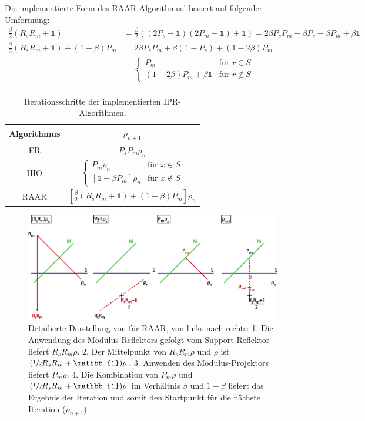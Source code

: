 	Die implementierte Form des RAAR Algorithmus' basiert auf folgender Umformung:
	\begin{align*}
	\frac{\beta}{2}\left(R_sR_m+\mathbb{1}\right)
	&=\frac{\beta}{2}\left((2P_s-\mathbb{1})(2P_m-\mathbb{1})+\mathbb{1}\right)
		=2\beta P_sP_m-\beta P_s-\beta P_m+\beta\mathbb{1}\\
		\frac{\beta}{2}\left(R_sR_m+\mathbb{1}\right)+\left(1-\beta\right) P_m
		&=2\beta P_sP_m+\beta (\mathbb{1}-P_s)+ (1-2\beta)P_m\\
		&=
		\begin{cases}
			P_m &\text{für } r\in S\\
			(1-2\beta)P_m+\beta\mathbb{1}  &\text{für } r\notin S
		\end{cases}\\
	\end{align*}
\begin{table}
	\centering
	\begin{tabular}{cc}
		\hline\hline
		Algorithmus 	&$\rho_{n+1}$\\ 							
		\hline
		ER  			&$P_sP_m\rho_n$\\ 								
		HIO  			&$\begin{cases}	
		P_m\rho_n  &\text{für } x\in S\\
		\left[\mathbb{1}-\beta P_m\right]\rho_n &\text{für } x\notin S
		\end{cases}$\\
		RAAR  			&$\left[\frac{\beta}{2}\left(R_sR_m+\mathbb{1}\right)+\left(1-\beta\right)P_m\right]\rho_n$\\																
		\hline\hline
	\end{tabular}
	\caption[IPR-Algorithmen]{Iterationsschritte der implementierten IPR-Algorithmen.}
	\label{tab:ipr}
\end{table}	

	\begin{figure}
		\centering
		\includegraphics[width=1\textwidth]{images/raar.eps}
		\caption[RAAR]{Detailierte Darstellung von  für RAAR, von links nach rechts: 1. Die Anwendung des Modulus-Reflektors gefolgt vom Support-Reflektor liefert $R_sR_m\rho$. 2. Der Mittelpunkt von $R_sR_m\rho$ und $\rho$ ist $(\sfrac{1}{2}R_sR_m+\mathbb{1})\rho$. 3. Anwenden des Modulus-Projektors liefert $P_m\rho$. 4. Die Kombination von $P_m\rho$ und $(\sfrac{1}{2}R_sR_m+\mathbb{1})\rho$ im Verhältnis $\beta$ und $1-\beta$ liefert das Ergebnis der Iteration  und somit den Startpunkt für die nächste Iteration ($\rho_{n+1}$).}
		\label{fig:raar}
	\end{figure} 	
